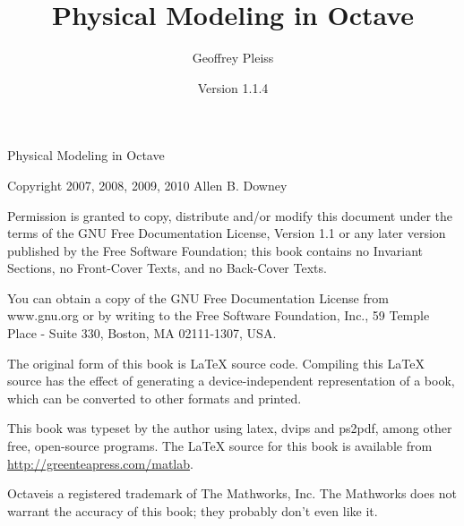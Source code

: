 \documentclass{book}
\newcommand{\myreg}{\textsuperscript{{\tiny \textregistered}}}
\begin{document}
\newcommand{\thetitle}{Physical Modeling in Octave\myreg}
\newcommand{\theauthor}{Geoffrey Pleiss}
\newcommand{\theversion}{1.1.4}

\title {\thetitle}
\author {\theauthor}
\date {Version \theversion}



\begin{latexonly}



\maketitle

\vspace{2in}

\begin{center}
{\Large \thetitle}

\vspace{0.25in}

Copyright 2007, 2008, 2009, 2010 Allen B. Downey
\end{center}

\vspace{0.25in}

Permission is granted to copy, distribute and/or modify this
document under the terms of the GNU Free Documentation License,
Version 1.1 or any later version published by the Free Software
Foundation; this book contains no Invariant Sections,
no Front-Cover Texts, and no Back-Cover Texts.

You can obtain a copy of the GNU Free Documentation License
from www.gnu.org or by writing to the Free Software Foundation,
Inc., 59 Temple Place - Suite 330, Boston, MA 02111-1307, USA.

The original form of this book is LaTeX source code.
Compiling this LaTeX source has the effect of generating
a device-independent representation of a book, which
can be converted to other formats and printed.

This book was typeset by the author using latex, dvips and ps2pdf,
among other free, open-source programs.
The LaTeX source for this book is available from
\url{http://greenteapress.com/matlab}.

Octave\myreg is a registered trademark of The
Mathworks, Inc. The Mathworks does not warrant the accuracy
of this book; they probably don't even like it.

\frontmatter

\end{latexonly}
\end{document}

